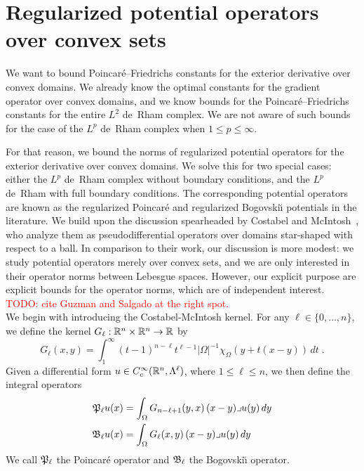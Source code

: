 \documentclass[12pt,a4paper]{article}
\newcommand{\todo}[1]{\textcolor{red}{TODO: #1}}
\begin{document}
\section{Regularized potential operators over convex sets}\label{section:potentialoperator}

We want to bound Poincar\'e--Friedrichs constants for the exterior derivative over convex domains.
We already know the optimal constants for the gradient operator over convex domains,
and we know bounds for the Poincar\'e--Friedrichs constants for the entire $L^{2}$ de~Rham complex. 
We are not aware of such bounds for the case of the $L^{p}$ de~Rham complex when $1 \leq p \leq \infty$. 

For that reason, we bound the norms of regularized potential operators for the exterior derivative over convex domains.
We solve this for two special cases: either the $L^{p}$ de~Rham complex without boundary conditions, 
and the $L^{p}$ de~Rham with full boundary conditions. 
The corresponding potential operators are known as the regularized Poincar\'e and regularized Bogovski\u{\i} potentials in the literature. 
We build upon the discussion spearheaded by Costabel and McIntosh~\cite{costabel2010bogovskiui},
who analyze them as pseudodifferential operators over domains star-shaped with respect to a ball. 
% 
In comparison to their work, our discussion is more modest:
we study potential operators merely over convex sets, and we are only interested in their operator norms between Lebesgue spaces.
However, our explicit purpose are explicit bounds for the operator norms, which are of independent interest. 
\\

\todo{cite Guzman and Salgado at the right spot.}\\


We begin with introducing the Costabel-McIntosh kernel.
For any $\ell \in \{0,\dotsc,n\}$, we define the kernel $G_{\ell} : {\mathbb R}^{n} \times {\mathbb R}^{n} \rightarrow {\mathbb R}$ by
\begin{equation}\label{eq:Gl}
  G_{\ell}(x,y) = \int_{1}^\infty (t-1)^{n-\ell}t^{\ell-1} |\Omega|^{-1}\chi_{\Omega} \left(y+t(x-y)\right)\,dt \;.
\end{equation}
Given a differential form $u \in {C^\infty_c}({\mathbb R}^n,\Lambda^\ell)$, where \(1 \leq \ell \leq n\), 
we then define the integral operators
\begin{align}
  {\mathfrak P}_{\ell} u(x) &= \int_{\Omega} G_{n-\ell+1}(y,x) \,(x-y)\lrcorner u(y)\,dy
  \\
  {\mathfrak B}_{\ell} u(x) &= \int_{\Omega} G_{\ell}(x,y) \,(x-y)\lrcorner u(y)\,dy
\end{align}
We call ${\mathfrak P}_{\ell}$ the Poincar\'e operator and ${\mathfrak B}_{\ell}$ the Bogovski\u{\i} operator. 
\\
\end{document}
